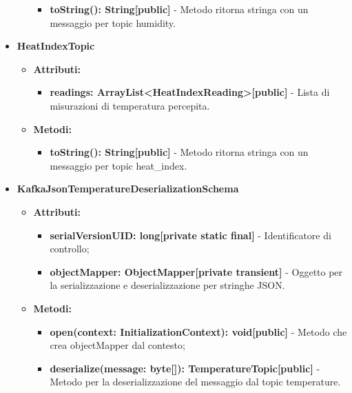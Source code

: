 \documentclass[8pt]{article}
\begin{document}
\begin{itemize}
\begin{itemize}
        \begin{itemize}
            \item \textbf{toString(): String[public]} - Metodo ritorna stringa con un messaggio per topic humidity.
        \end{itemize}
    \end{itemize}
    \item \textbf{HeatIndexTopic}
    \begin{itemize}
        \item \textbf{Attributi:}
        \begin{itemize}
            \item \textbf{readings: ArrayList<HeatIndexReading>[public]} - Lista di misurazioni di temperatura percepita.
        \end{itemize}
    \end{itemize}
    \begin{itemize}
        \item \textbf{Metodi:}
        \begin{itemize}
            \item \textbf{toString(): String[public]} - Metodo ritorna stringa con un messaggio per topic heat\_index.
        \end{itemize}
    \end{itemize}
    \item \textbf{KafkaJsonTemperatureDeserializationSchema}
    \begin{itemize}
        \item \textbf{Attributi:}
        \begin{itemize}
            \item \textbf{serialVersionUID: long[private static final]} - Identificatore di controllo;
            \item \textbf{objectMapper: ObjectMapper[private transient]} - Oggetto per la serializzazione e deserializzazione per stringhe JSON.
        \end{itemize}
    \end{itemize}
    \begin{itemize}
        \item \textbf{Metodi:}
        \begin{itemize}
            \item \textbf{open(context: InitializationContext): void[public]} - Metodo che crea objectMapper dal contesto;
            \item \textbf{deserialize(message: byte[]): TemperatureTopic[public]} - Metodo per la deserializzazione del messaggio dal topic temperature.

\end{itemize}
\end{itemize}
\end{itemize}
\end{document}
